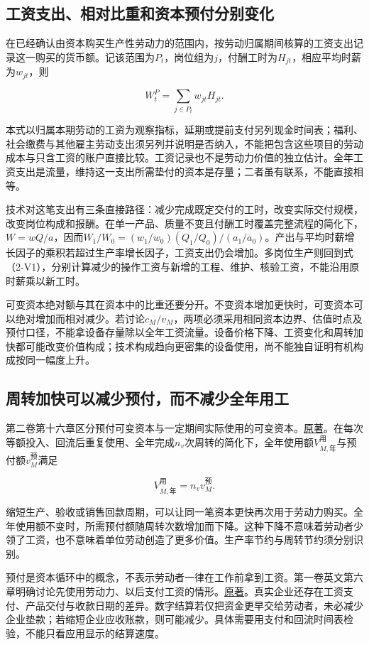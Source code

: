 \documentclass[UTF8,fontset=windows,12pt,a4paper,oneside,openany]{ctexbook}
\begin{document}
\subsection{工资支出、相对比重和资本预付分别变化}

在已经确认由资本购买生产性劳动力的范围内，按劳动归属期间核算的工资支出记录这一购买的货币额。记该范围为$P_t$，岗位组为$j$，付酬工时为$H_{jt}$，相应平均时薪为$w_{jt}$，则

\[
W_t^{P}=\sum_{j\in P_t}w_{jt}H_{jt}.
\tag{2-V1}
\]

本式以归属本期劳动的工资为观察指标，延期或提前支付另列现金时间表；福利、社会缴费与其他雇主劳动支出须另列并说明是否纳入，不能把包含这些项目的劳动成本与只含工资的账户直接比较。工资记录也不是劳动力价值的独立估计。全年工资支出是流量，维持这一支出所需垫付的资本是存量；二者虽有联系，不能直接相等。

技术对这笔支出有三条直接路径：减少完成既定交付的工时，改变实际交付规模，改变岗位构成和报酬。在单一产品、质量不变且付酬工时覆盖完整流程的简化下，$W=wQ/a$，因而$W_1/W_0=(w_1/w_0)(Q_1/Q_0)/(a_1/a_0)$。产出与平均时薪增长因子的乘积若超过生产率增长因子，工资支出仍会增加。多岗位生产则回到式（2-V1），分别计算减少的操作工资与新增的工程、维护、核验工资，不能沿用原时薪乘以新工时。

可变资本绝对额与其在资本中的比重还要分开。不变资本增加更快时，可变资本可以绝对增加而相对减少。若讨论$c_M/v_M$，两项必须采用相同资本边界、估值时点及预付口径，不能拿设备存量除以全年工资流量。设备价格下降、工资变化和周转加快都可能改变价值构成；技术构成趋向更密集的设备使用，尚不能独自证明有机构成按同一幅度上升。

\subsection{周转加快可以减少预付，而不减少全年用工}

第二卷第十六章区分预付可变资本与一定期间实际使用的可变资本。\href{https://www.marxists.org/archive/marx/works/1885-c2/ch16.htm}{原著}。在每次等额投入、回流后重复使用、全年完成$n_v$次周转的简化下，全年使用额$V_{M,\mathrm{年}}^{\mathrm{用}}$与预付额$v_M^{\mathrm{预}}$满足

\[
V_{M,\mathrm{年}}^{\mathrm{用}}=n_vv_M^{\mathrm{预}}.
\tag{2-V2}
\]

缩短生产、验收或销售回款周期，可以让同一笔资本更快再次用于劳动力购买。全年使用额不变时，所需预付额随周转次数增加而下降。这种下降不意味着劳动者少领了工资，也不意味着单位劳动创造了更多价值。生产率节约与周转节约须分别识别。

预付是资本循环中的概念，不表示劳动者一律在工作前拿到工资。第一卷英文第六章明确讨论先使用劳动力、以后支付工资的情形。\href{https://www.marxists.org/archive/marx/works/1867-c1/ch06.htm}{原著}。真实企业还存在工资支付、产品交付与收款日期的差异。数字结算若仅把资金更早交给劳动者，未必减少企业垫款；若缩短企业应收账款，则可能减少。具体需要用支付和回流时间表检验，不能只看应用显示的结算速度。
\end{document}
